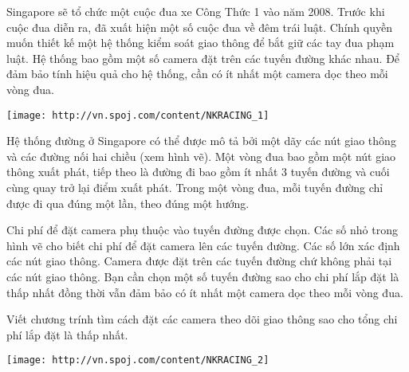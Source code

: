 Singapore sẽ tổ chức một cuộc đua xe Công Thức 1 vào năm 2008. Trước khi cuộc đua diễn ra, đã xuất hiện một số cuộc đua về đêm trái luật. Chính quyền muốn thiết kế một hệ thống kiểm soát giao   thông để bắt giữ các tay đua phạm luật. Hệ thống bao gồm một số camera đặt trên các tuyến đường khác nhau. Để đảm bảo tính hiệu quả cho hệ thống, cần có ít nhất một camera dọc theo mỗi vòng đua.  


\texttt{[image: http://vn.spoj.com/content/NKRACING\_1]}

   Hệ thống đường ở Singapore có thể được mô tả bởi một dãy các nút giao thông và các đường nối hai chiều (xem hình vẽ). Một vòng đua bao gồm một nút giao thông xuất phát, tiếp theo là đường đi bao   gồm ít nhất 3 tuyến đường và cuối cùng quay trở lại điểm xuất phát. Trong một vòng đua, mỗi tuyến đường chỉ được đi qua đúng một lần, theo đúng một hướng.  

   Chi phí để đặt camera phụ thuộc vào tuyến đường được chọn. Các số nhỏ trong hình vẽ cho biết chi phí để đặt camera lên các tuyến đường. Các số lớn xác định các nút giao thông. Camera được đặt trên   các tuyến đường chứ không phải tại các nút giao thông. Bạn cần chọn một số tuyến đường sao cho chi phí lắp đặt là thấp nhất đồng thời vẫn đảm bảo có ít nhất một camera dọc theo mỗi vòng đua.  

   Viết chương trính tìm cách đặt các camera theo dõi giao thông sao cho tổng chi phí lắp đặt là thấp nhất.  


\texttt{[image: http://vn.spoj.com/content/NKRACING\_2]}